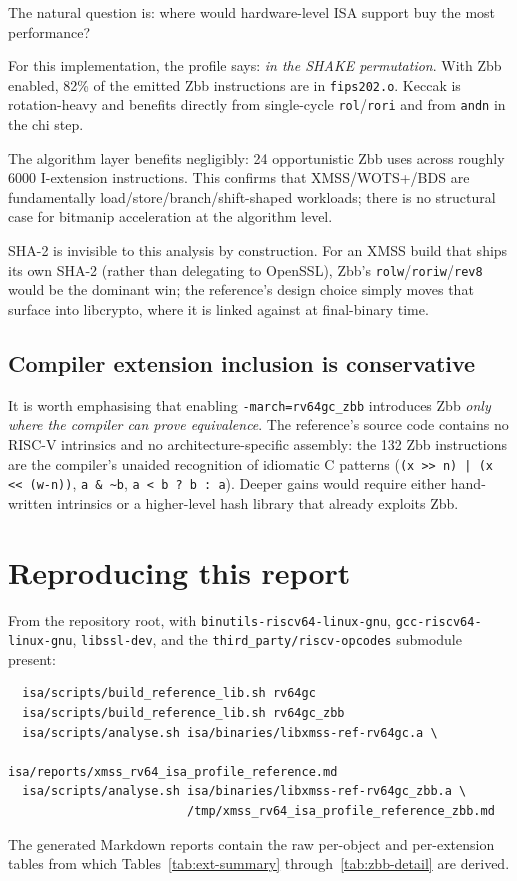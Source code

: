 \documentclass[11pt,a4paper]{article}
\begin{document}
The natural question is: where would hardware-level ISA support buy
the most performance?

For this implementation, the profile says: \emph{in the SHAKE
permutation}.  With Zbb enabled, 82\% of the emitted Zbb instructions
are in \texttt{fips202.o}.  Keccak is rotation-heavy and benefits
directly from single-cycle \texttt{rol}/\texttt{rori} and from
\texttt{andn} in the chi step.

The algorithm layer benefits negligibly: 24 opportunistic Zbb uses
across roughly 6000 I-extension instructions.  This confirms that
XMSS/WOTS+/BDS are fundamentally load/store/branch/shift-shaped
workloads; there is no structural case for bitmanip acceleration at
the algorithm level.

SHA-2 is invisible to this analysis by construction.  For an XMSS
build that ships its own SHA-2 (rather than delegating to OpenSSL),
Zbb's \texttt{rolw}/\texttt{roriw}/\texttt{rev8} would be the dominant
win; the reference's design choice simply moves that surface into
libcrypto, where it is linked against at final-binary time.

\subsection{Compiler extension inclusion is conservative}

It is worth emphasising that enabling \texttt{-march=rv64gc\_zbb}
introduces Zbb \emph{only where the compiler can prove equivalence}.
The reference's source code contains no RISC-V intrinsics and no
architecture-specific assembly: the 132 Zbb instructions are the
compiler's unaided recognition of idiomatic C patterns
(\texttt{(x >> n) | (x << (w-n))}, \texttt{a \& \textasciitilde b},
\texttt{a < b ? b : a}).  Deeper gains would require either
hand-written intrinsics or a higher-level hash library that already
exploits Zbb.

\section{Reproducing this report}

From the repository root, with
\texttt{binutils-riscv64-linux-gnu}, \texttt{gcc-riscv64-linux-gnu},
\texttt{libssl-dev}, and the \texttt{third\_party/riscv-opcodes}
submodule present:

\begin{verbatim}
  isa/scripts/build_reference_lib.sh rv64gc
  isa/scripts/build_reference_lib.sh rv64gc_zbb
  isa/scripts/analyse.sh isa/binaries/libxmss-ref-rv64gc.a \
                         isa/reports/xmss_rv64_isa_profile_reference.md
  isa/scripts/analyse.sh isa/binaries/libxmss-ref-rv64gc_zbb.a \
                         /tmp/xmss_rv64_isa_profile_reference_zbb.md
\end{verbatim}

The generated Markdown reports contain the raw per-object and
per-extension tables from which Tables~\ref{tab:ext-summary}
through~\ref{tab:zbb-detail} are derived.
\end{document}
